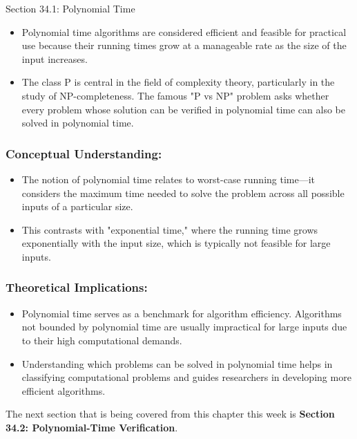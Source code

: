\begin{notes}{Section 34.1: Polynomial Time}
    \begin{itemize}
        \item Polynomial time algorithms are considered efficient and feasible for practical use because their running times grow at a manageable rate as the size of the input increases.
        \item The class P is central in the field of complexity theory, particularly in the study of NP-completeness. The famous "P vs NP" problem asks whether every problem whose solution can be 
        verified in polynomial time can also be solved in polynomial time.
    \end{itemize}
    
    \subsubsection*{Conceptual Understanding:}
    
    \begin{itemize}
        \item The notion of polynomial time relates to worst-case running time—it considers the maximum time needed to solve the problem across all possible inputs of a particular size.
        \item This contrasts with "exponential time," where the running time grows exponentially with the input size, which is typically not feasible for large inputs.
    \end{itemize}
    
    \subsubsection*{Theoretical Implications:}
    
    \begin{itemize}
        \item Polynomial time serves as a benchmark for algorithm efficiency. Algorithms not bounded by polynomial time are usually impractical for large inputs due to their high computational demands.
        \item Understanding which problems can be solved in polynomial time helps in classifying computational problems and guides researchers in developing more efficient algorithms.
    \end{itemize}    
\end{notes}

The next section that is being covered from this chapter this week is \textbf{Section 34.2: Polynomial-Time Verification}.

